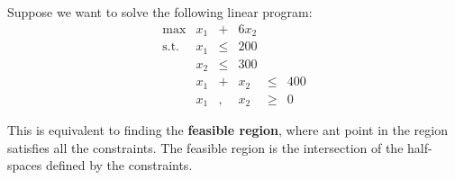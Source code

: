 \begin{example}
    Suppose we want to solve the following linear program: \[ \begin{matrix}
        \max        & x_1 & +    & 6x_2              \\
        \text{s.t.} & x_1 & \leq & 200               \\
                    & x_2 & \leq & 300               \\
                    & x_1 & +    & x_2  & \leq & 400 \\
                    & x_1 & ,    & x_2  & \geq & 0
    \end{matrix} \]

    This is equivalent to finding the \textbf{feasible region}, where ant point in the region satisfies all the constraints. The feasible region is the intersection of the half-spaces defined by the constraints.

    \begin{figure}[ht!]
        \centering


\end{figure}
\end{example}
